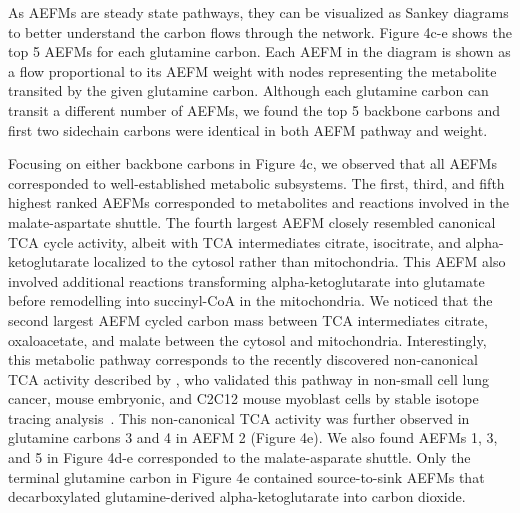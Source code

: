\documentclass[12pt]{article}
\begin{document}
As AEFMs are steady state pathways, they can be visualized as Sankey
diagrams to better understand the carbon flows through the network. Figure
4c-e shows the top 5 AEFMs for each glutamine carbon. Each AEFM in the
diagram is shown as a flow proportional to its AEFM weight with nodes
representing the metabolite transited by the given glutamine carbon.
Although each glutamine carbon can transit a different number of AEFMs, we
found the top 5 backbone carbons and first two sidechain carbons were
identical in both AEFM pathway and weight.
    
Focusing on either backbone carbons in Figure 4c, we observed that all
AEFMs corresponded to well-established metabolic subsystems. The first,
third, and fifth highest ranked AEFMs corresponded to metabolites and
reactions involved in the malate-aspartate shuttle. The fourth largest
AEFM closely resembled canonical TCA cycle activity, albeit with TCA
intermediates citrate, isocitrate, and alpha-ketoglutarate localized to
the cytosol rather than mitochondria. This AEFM also involved additional
reactions transforming alpha-ketoglutarate into glutamate before
remodelling into succinyl-CoA in the mitochondria. We noticed that the
second largest AEFM cycled carbon mass between TCA intermediates citrate,
oxaloacetate, and malate between the cytosol and mitochondria.
Interestingly, this metabolic pathway corresponds to the recently
discovered non-canonical TCA activity described by
\citeauthor{ArnoldPaigeK2022Anta}, who validated this pathway in non-small
cell lung cancer, mouse embryonic, and C2C12 mouse myoblast cells by
stable isotope tracing analysis~\citep{ArnoldPaigeK2022Anta}. This
non-canonical TCA activity was further observed in glutamine carbons
3 and 4 in AEFM 2 (Figure 4e). We also found AEFMs 1, 3, and 5 in Figure
  4d-e corresponded to the malate-asparate shuttle. Only the terminal
  glutamine carbon in Figure 4e contained source-to-sink AEFMs that
  decarboxylated glutamine-derived alpha-ketoglutarate into carbon
  dioxide.
\end{document}
